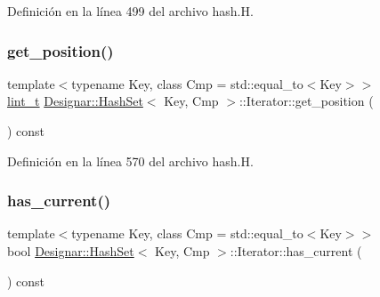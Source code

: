 Definición en la línea 499 del archivo hash.\+H.

\mbox{\label{class_designar_1_1_hash_set_1_1_iterator_a12b236661945aa10228f0523b6e1ab5e}} 
\subsubsection{\texorpdfstring{get\+\_\+position()}{get\_position()}}
{\footnotesize\ttfamily template$<$typename Key, class Cmp = std\+::equal\+\_\+to$<$\+Key$>$$>$ \\
\hyperlink{namespace_designar_a9d113d66a39e82b73727c72cd3a52f73}{lint\+\_\+t} \hyperlink{class_designar_1_1_hash_set}{Designar\+::\+Hash\+Set}$<$ Key, Cmp $>$\+::Iterator\+::get\+\_\+position (\begin{DoxyParamCaption}{ }\end{DoxyParamCaption}) const\hspace{0.3cm}{\ttfamily [inline]}}



Definición en la línea 570 del archivo hash.\+H.

\mbox{\label{class_designar_1_1_hash_set_1_1_iterator_a13dc6ab67d6d4a380e2f1cb4fd6d3ae2}} 
\subsubsection{\texorpdfstring{has\+\_\+current()}{has\_current()}}
{\footnotesize\ttfamily template$<$typename Key, class Cmp = std\+::equal\+\_\+to$<$\+Key$>$$>$ \\
bool \hyperlink{class_designar_1_1_hash_set}{Designar\+::\+Hash\+Set}$<$ Key, Cmp $>$\+::Iterator\+::has\+\_\+current (\begin{DoxyParamCaption}{ }\end{DoxyParamCaption}) const\hspace{0.3cm}{\ttfamily [inline]}}



